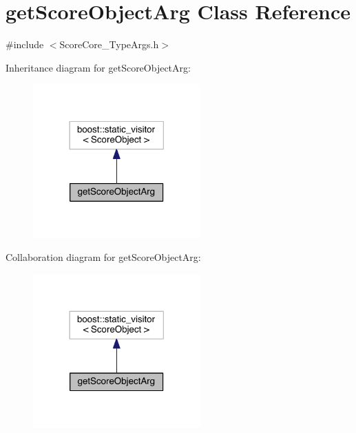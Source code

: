 \hypertarget{classget_score_object_arg}{\section{get\-Score\-Object\-Arg Class Reference}
\label{classget_score_object_arg}
}


{\ttfamily \#include $<$Score\-Core\-\_\-\-Type\-Args.\-h$>$}



Inheritance diagram for get\-Score\-Object\-Arg\-:\nopagebreak
\begin{figure}[H]
\begin{center}
\leavevmode
\includegraphics[width=182pt]{classget_score_object_arg__inherit__graph}
\end{center}
\end{figure}


Collaboration diagram for get\-Score\-Object\-Arg\-:\nopagebreak
\begin{figure}[H]
\begin{center}
\leavevmode
\includegraphics[width=182pt]{classget_score_object_arg__coll__graph}
\end{center}
\end{figure}
